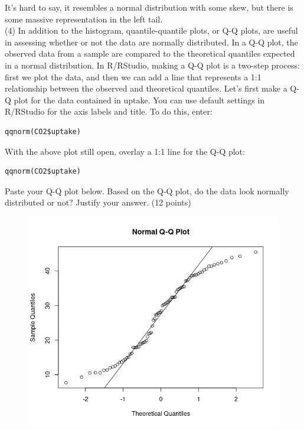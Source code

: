 \documentclass{article}
\begin{document}
It's hard to say, it resembles a normal distribution with some skew, but there is some massive representation in the left tail.\\

(4) In addition to the histogram, quantile-quantile plots, or Q-Q plots, are useful in assessing whether or not the data are normally distributed. In a Q-Q plot, the observed data from a sample are compared to the theoretical quantiles expected in a normal distribution. In R/RStudio, making a Q-Q plot is a two-step process: first we plot the data, and then we can add a line that represents a 1:1 relationship between the observed and theoretical quantiles. Let’s first make a Q-Q plot for the data contained in uptake. You can use default settings in R/RStudio for the axis labels and title. To do this, enter:
\begin{center}
\begin{lstlisting}
qqnorm(CO2$uptake)
\end{lstlisting}
\end{center}


With the above plot still open, overlay a 1:1 line for the Q-Q plot:

\begin{center}
\begin{lstlisting}
qqnorm(CO2$uptake)
\end{lstlisting}
\end{center}


Paste your Q-Q plot below. Based on the Q-Q plot, do the data look normally distributed or not? Justify your answer. (12 points)

\begin{figure}[H]
    \includegraphics[scale = 0.5]{qq_normal.png}
\end{figure}
\end{document}
